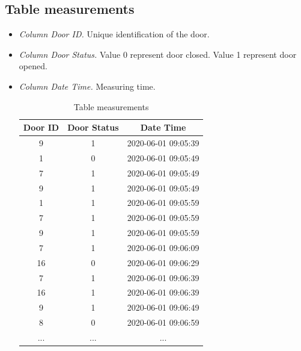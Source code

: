 \subsection*{Table measurements}
\begin{itemize}
    \item \textsl{Column Door ID.} Unique identification of the door.
    \item \textsl{Column Door Status.} Value 0 represent door closed. Value 1 represent door opened.
    \item \textsl{Column Date Time.} Measuring time.
    \begin{table}[htb]
    \centering
    \begin{tabular}{|c| c| c|} 
    \hline
    Door ID & Door Status & Date Time \\
    \hline
    9 & 1 & 2020-06-01 09:05:39 \\ \hline
    1 & 0 & 2020-06-01 09:05:49 \\ \hline
    7 & 1 & 2020-06-01 09:05:49 \\ \hline
    9 & 1 & 2020-06-01 09:05:49 \\ \hline
    1 & 1 & 2020-06-01 09:05:59 \\ \hline
    7 & 1 & 2020-06-01 09:05:59 \\ \hline
    9 & 1 & 2020-06-01 09:05:59 \\ \hline
    7 & 1 & 2020-06-01 09:06:09 \\ \hline
    16 & 0 & 2020-06-01 09:06:29 \\ \hline
    7 & 1 & 2020-06-01 09:06:39 \\ \hline
    16 & 1 & 2020-06-01 09:06:39 \\ \hline
    9 & 1 & 2020-06-01 09:06:49 \\ \hline
    8 & 0 & 2020-06-01 09:06:59 \\ \hline
    ... & ...& ... \\ \hline
    \end{tabular}
    \caption{Table measurements}
    \label{tab:db_measurement_result}
    \end{table}
\end{itemize}

